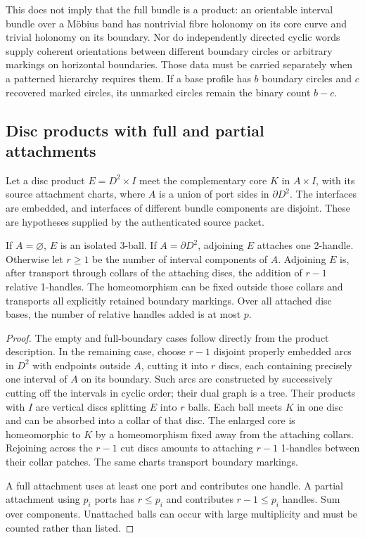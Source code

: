 This does not imply that the full bundle is a product: an orientable
interval bundle over a M\"obius band has nontrivial fibre holonomy on its
core curve and trivial holonomy on its boundary.  Nor do independently
directed cyclic words supply coherent orientations between different
boundary circles or arbitrary markings on horizontal boundaries.  Those
data must be carried separately when a patterned hierarchy requires them.
If a base profile has $b$ boundary circles and $c$ recovered marked circles,
its unmarked circles remain the binary count $b-c$.

\subsection{Disc products with full and partial attachments}

Let a disc product $E=D^2\times I$ meet the complementary core $K$ in
$A\times I$, with its source attachment charts, where $A$ is a union of
port sides in $\partial D^2$.  The interfaces are embedded, and interfaces
of different bundle components are disjoint.  These are hypotheses supplied
by the authenticated source packet.

\begin{theorem}
\label{thm:partial-disc-replacement}
If $A=\varnothing$, $E$ is an isolated 3-ball.  If $A=\partial D^2$, adjoining
$E$ attaches one 2-handle.  Otherwise let $r\geq1$ be the number of interval
components of $A$.  Adjoining $E$ is, after transport through collars of the
attaching discs, the addition of $r-1$ relative 1-handles.  The homeomorphism
can be fixed outside those collars and transports all explicitly retained
boundary markings.  Over all attached disc bases, the number of relative
handles added is at most $p$.
\end{theorem}
\begin{proof}
The empty and full-boundary cases follow directly from the product
description.  In the remaining case, choose $r-1$ disjoint properly embedded
arcs in $D^2$ with endpoints outside $A$, cutting it into $r$ discs, each
containing precisely one interval of $A$ on its boundary.  Such arcs are
constructed by successively cutting off the intervals in cyclic order;
their dual graph is a tree.  Their products with $I$ are vertical discs
splitting $E$ into $r$ balls.  Each ball meets $K$ in one disc and can be
absorbed into a collar of that disc.  The enlarged core is homeomorphic to
$K$ by a homeomorphism fixed away from the attaching collars.  Rejoining
across the $r-1$ cut discs amounts to attaching $r-1$ 1-handles between
their collar patches.  The same charts transport boundary markings.

A full attachment uses at least one port and contributes one handle.
A partial attachment using $p_i$ ports has $r\leq p_i$ and contributes
$r-1\leq p_i$ handles.  Sum over components.  Unattached balls can occur
with large multiplicity and must be counted rather than listed.
\end{proof}

